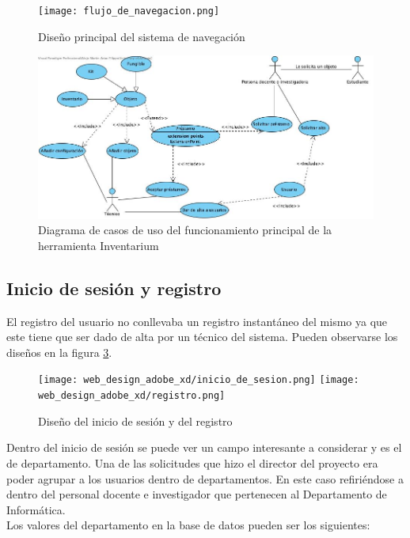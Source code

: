 \begin{figure}[h]
    \texttt{[image: flujo\_de\_navegacion.png]}
    \caption{Diseño principal del sistema de navegación}\label{diseno_principal_sistema_navegacion}
\end{figure}

\begin{figure}[h]
    \includegraphics[width=\textwidth,height=\textheight,keepaspectratio]{../../diagramas/visual_paradigm/funcionamiento_principal.jpg}
    \caption{Diagrama de casos de uso del funcionamiento principal de la herramienta Inventarium}\label{funcionamiento_principal_casos_de_uso}
\end{figure}


\subsection{Inicio de sesión y registro}

El registro del usuario no conllevaba un registro instantáneo del mismo ya que este tiene que ser dado de alta por un técnico del sistema. Pueden observarse los diseños en la figura \ref{inicio_registro_design}.

\begin{figure}[h]
    \begin{center}
        \texttt{[image: web\_design\_adobe\_xd/inicio\_de\_sesion.png]}
        \texttt{[image: web\_design\_adobe\_xd/registro.png]}
        \caption{Diseño del inicio de sesión y del registro}\label{inicio_registro_design}
    \end{center}
\end{figure}

Dentro del inicio de sesión se puede ver un campo interesante a considerar y es el de departamento. Una de las solicitudes que hizo el director del proyecto era poder agrupar a los usuarios dentro de departamentos. En este caso refiriéndose a dentro del personal docente e investigador que pertenecen al Departamento de Informática.
\\Los valores del departamento en la base de datos pueden ser los siguientes:


